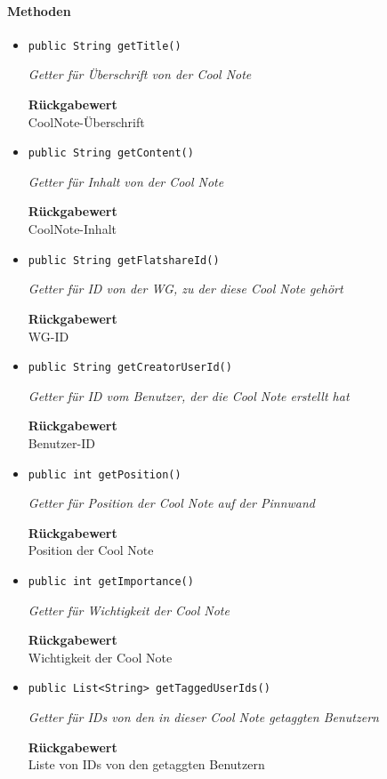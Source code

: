     \paragraph*{Methoden}
    \begin{itemize}
    	\item{\texttt{public String getTitle()}}
    	
    	\textit{Getter für Überschrift von der Cool Note}
    	
    	
    	
    	\textbf{Rückgabewert} \\
    	CoolNote-Überschrift        \item{\texttt{public String getContent()}}
    	
    	\textit{Getter für Inhalt von der Cool Note}
    	
    	
    	
    	\textbf{Rückgabewert} \\
    	CoolNote-Inhalt        \item{\texttt{public String getFlatshareId()}}
    	
    	\textit{Getter für ID von der WG, zu der diese Cool Note gehört}
    	
    	
    	
    	\textbf{Rückgabewert} \\
    	WG-ID        \item{\texttt{public String getCreatorUserId()}}
    	
    	\textit{Getter für ID vom Benutzer, der die Cool Note erstellt hat}
    	
    	
    	
    	\textbf{Rückgabewert} \\
    	Benutzer-ID        \item{\texttt{public int getPosition()}}
    	
    	\textit{Getter für Position der Cool Note auf der Pinnwand}
    	
    	
    	
    	\textbf{Rückgabewert} \\
    	Position der Cool Note        \item{\texttt{public int getImportance()}}
    	
    	\textit{Getter für Wichtigkeit der Cool Note}
    	
    	
    	
    	\textbf{Rückgabewert} \\
    	Wichtigkeit der Cool Note        \item{\texttt{public List<String> getTaggedUserIds()}}
    	
    	\textit{Getter für IDs von den in dieser Cool Note getaggten Benutzern}
    	
    	
    	
    	\textbf{Rückgabewert} \\
    	Liste von IDs von den getaggten Benutzern
    \end{itemize}
